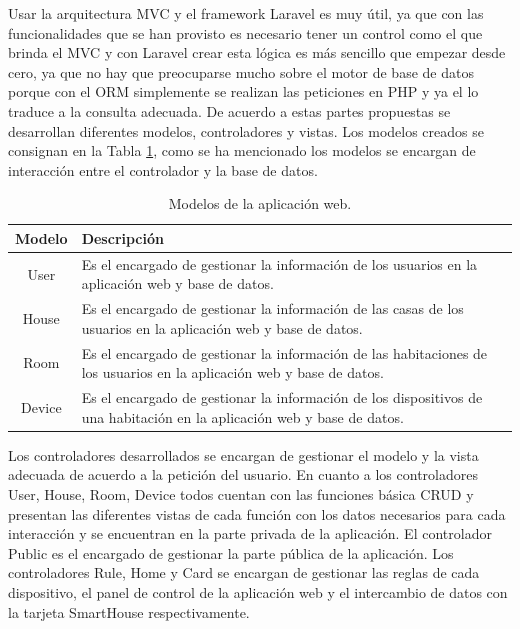 Usar la arquitectura MVC y el framework Laravel es muy útil, ya que con las funcionalidades que se han provisto es necesario tener un control como el que brinda el MVC y con Laravel crear esta lógica es más sencillo que empezar desde cero, ya que no hay que preocuparse mucho sobre el motor de base de datos porque con el ORM simplemente se realizan las peticiones en PHP y ya el lo traduce a la consulta adecuada. De acuerdo a estas partes propuestas se desarrollan diferentes modelos, controladores y vistas. Los modelos creados se consignan en la Tabla \ref{table:models}, como se ha mencionado los modelos se encargan de interacción entre el controlador y la base de datos.\\

\begin{table}
	\begin{center}
		\caption{Modelos de la aplicación web.}
		\label{table:models}
		\begin{tabular}{|c|p{7cm}|}
			\hline 
			\textbf{Modelo} & \textbf{Descripción} \\ 
			\hline 
			User & Es el encargado de gestionar la información de los usuarios en la aplicación web y base de datos.\\ 
			\hline 
			House & Es el encargado de gestionar la información de las casas de los usuarios en la aplicación web y base de datos.\\ 
			\hline 
			Room & Es el encargado de gestionar la información de las habitaciones de los usuarios en la aplicación web y base de datos.\\ 
			\hline 
			Device & Es el encargado de gestionar la información de los dispositivos de una habitación en la aplicación web y base de datos.\\
			\hline
		\end{tabular} 
	\end{center}
\end{table}

Los controladores desarrollados se encargan de gestionar el modelo y la vista adecuada de acuerdo a la petición del usuario. En cuanto a los controladores User, House, Room, Device todos cuentan con las funciones básica CRUD y presentan las diferentes vistas de cada función con los datos necesarios para cada interacción y se encuentran en la parte privada de la aplicación. El controlador Public es el encargado de gestionar la parte pública de la aplicación. Los controladores Rule, Home y Card se encargan de gestionar las reglas de cada dispositivo, el panel de control de la aplicación web y el intercambio de datos con la tarjeta SmartHouse respectivamente.\\

